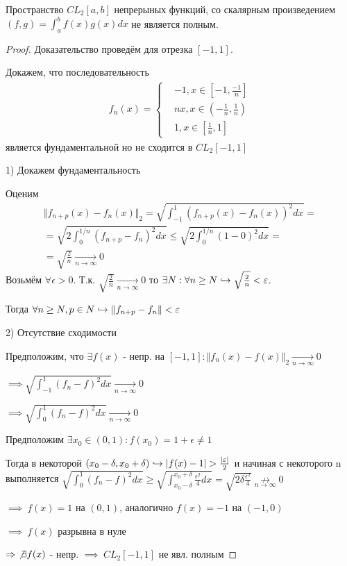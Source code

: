 \documentclass{article}
\begin{document}
\begin{theorem}
  Пространство $CL_2[a,b]$ непрерыных функций, со скалярным произведением
  $(f,g)=\int_{a}^{b}f(x)g(x)dx$ не является полным.  
\end{theorem}
\begin{proof}
  Доказательство проведём для отрезка $[-1,1]$.

  Докажем, что последовательность
  \begin{gather*}
    f_n(x)=\left\{\begin{aligned}
      & -1, x \in [-1,\frac{-1}{n}] \\ 
      & nx, x \in (-\frac{1}{n}, \frac{1}{n}) \\ 
      & 1, x \in [\frac{1}{n},1]
    \end{aligned}\right.
  \end{gather*}
  является фундаментальной но не сходится в $CL_2[-1,1]$


  1) Докажем фундаментальность 


  Оценим
  \begin{gather*}
    \Vert f_{n+p}(x)-f_n(x) \Vert_2=\sqrt{\int_{-1}^{1}(f_{n+p}(x)-f_n(x))^{2}dx}= \\ 
    = \sqrt{2\int_{0}^{1/n}(f_{n+p}-f_n)^{2}dx} \le \sqrt{2\int_{0}^{1/n}(1-0)^{2}dx}= \\ 
    =\sqrt{\frac{2}{n}}\underset{n\to\infty}{\to} 0
  \end{gather*}
  Возьмём $\forall \epsilon >0$. Т.к. $\sqrt{\frac{2}{n}}\underset{n\to\infty}{\to}0$ то
  $\exists N: \forall n \ge N \true \sqrt{\frac{2}{n}}< \epsilon$.

  Тогда $\forall n \ge N, p \in N \true \Vert f_{n+p}-f_n \Vert<\epsilon$

  2) Отсутствие сходимости

  Предположим, что $\exists f(x)$ - непр. на $[-1,1]: \Vert f_n(x)-f(x) \Vert_2 \underset{n\to\infty}{\to}0$

  $\implies \sqrt{\int_{-1}^{1}(f_n-f)^{2}dx}\underset{n\to\infty}{\to}0$

  $\implies \sqrt{\int_{0}^{1}(f_n-f)^{2}dx}\underset{n\to\infty}{\to}0$

  Предположим $\exists x_0 \in (0,1): f(x_0)=1+\epsilon\neq 1$

  Тогда в некоторой $(x_0-\delta,x_0+\delta) \true |f(x)-1|> \frac{|\epsilon|}{2}$ и начиная с некоторого n выполняется
  $\sqrt{\int_{0}^{1}(f_n-f)^{2}dx}\ge \sqrt{\int_{x_0-\delta}^{x_0+\delta}\frac{\epsilon^{2}}{4}dx}=\sqrt{2\delta\frac{\epsilon^{2}}{4}} \underset{n\to\infty}{\not \to}0$

  $\implies \ f(x)=1$  на $(0,1)$, аналогично $f(x)=-1$ на $(-1,0)$

  $\implies \ f(x)$ разрывна в нуле

  $\implies \ \not \exists f(x)$ - непр. $\implies \ CL_2[-1,1]$ не явл. полным
\end{proof}
\end{document}
